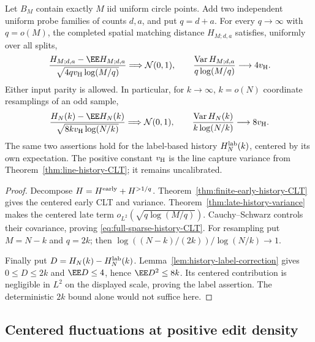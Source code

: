 \documentclass[11pt,letterpaper]{article}
\begin{document}
\begin{theorem}
\label{thm:full-sparse-history-CLT}
Let $B_M$ contain exactly $M$ iid uniform circle points.
Add two independent uniform probe families of counts $d,a$,
and put $q=d+a$. For every $q\to\infty$ with $q=o(M)$,
the completed spatial matching distance $H_{M;d,a}$ satisfies,
uniformly over all splits,
\begin{equation}\label{eq:full-sparse-history-CLT}
 \frac{H_{M;d,a}-\EE H_{M;d,a}}
          {\sqrt{4qv_{\rm H}\log(M/q)}}
       \Longrightarrow\mathcal N(0,1),\qquad
 \frac{\operatorname{Var}H_{M;d,a}}
                 {q\log(M/q)}\longrightarrow4v_{\rm H}.
\end{equation}
Either input parity is allowed.
In particular, for $k\to\infty$, $k=o(N)$ coordinate
resamplings of an odd sample,
\begin{equation}\label{eq:full-sublinear-resampling-CLT}
 \frac{H_N(k)-\EE H_N(k)}
          {\sqrt{8kv_{\rm H}\log(N/k)}}
        \Longrightarrow\mathcal N(0,1),\qquad
 \frac{\operatorname{Var}H_N(k)}
                 {k\log(N/k)}\longrightarrow8v_{\rm H}.
\end{equation}
The same two assertions hold for the label-based history
$H_N^{\rm lab}(k)$, centered by its own expectation.
The positive constant $v_{\rm H}$ is the line capture
variance from Theorem~\ref{thm:line-history-CLT}; it remains
uncalibrated.
\end{theorem}
\begin{proof}
Decompose $H=H^{\rm early}+H^{>1/q}$.
Theorem~\ref{thm:finite-early-history-CLT} gives the centered
early CLT and variance. Theorem~\ref{thm:late-history-variance}
makes the centered late term $o_{L^2}(\sqrt{q\log(M/q)})$.
Cauchy--Schwarz controls their covariance, proving
\eqref{eq:full-sparse-history-CLT}.
For resampling put $M=N-k$ and $q=2k$; then
$\log((N-k)/(2k))/\log(N/k)\to1$.

Finally put $D=H_N(k)-H_N^{\rm lab}(k)$.
Lemma~\ref{lem:history-label-correction} gives
$0\le D\le2k$ and $\EE D\le4$, hence
$\EE D^2\le8k$. Its centered contribution is negligible
in $L^2$ on the displayed scale, proving the label assertion.
The deterministic $2k$ bound alone would not suffice here.
\end{proof}

\subsection{Centered fluctuations at positive edit density}
\label{sec:dense-history-CLT}
\end{document}
